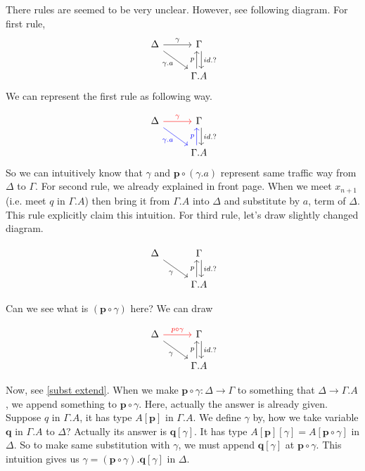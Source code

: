 \documentclass[12pt, a4paper, openany, twoside]{book}
\theoremstyle{definition}
\theoremstyle{remark}
\theoremstyle{plain}
\numberwithin{equation}{section}
\begin{document}
There rules are seemed to be very unclear. However, see following diagram. For first rule, 
\[
\begin{tikzcd}
    \Delta \arrow[r, "\gamma"] \arrow[rd, "\gamma.a"'] & \Gamma \arrow[d, "id.?", shift left]\\
    & \Gamma.A \arrow[u, "p", shift left]
\end{tikzcd}
\]
We can represent the first rule as following way. 

\[
\begin{tikzcd}
    \Delta \arrow[r, "\gamma", red] \arrow[rd, "\gamma.a"', blue] & \Gamma \arrow[d, "id.?", shift left]\\
    & \Gamma.A \arrow[u, "p", shift left, blue]
\end{tikzcd}
\]
So we can intuitively know that $\gamma$ and $\mathbf{p} \circ (\gamma.a)$ represent same traffic way from $\Delta$ to $\Gamma$. 
For second rule, we already explained in front page. When we meet $x_{n+1}$ (i.e. meet $q$ in $\Gamma.A$) 
then bring it from $\Gamma.A$ into $\Delta$ and substitute by $a$, term of $\Delta$. This rule explicitly claim this intuition. 
For third rule, let's draw slightly changed diagram. 

\[
\begin{tikzcd}
    \Delta  \arrow[rd, "\gamma"'] & \Gamma \arrow[d, "id.?", shift left]\\
    & \Gamma.A \arrow[u, "p", shift left]
\end{tikzcd}
\]

Can we see what is $(\mathbf{p} \circ \gamma)$ here? We can draw 

\[
\begin{tikzcd}
    \Delta \arrow[r, "p\circ \gamma", red] \arrow[rd, "\gamma"'] & \Gamma \arrow[d, "id.?", shift left]\\
    & \Gamma.A \arrow[u, "p", shift left]
\end{tikzcd}
\]

Now, see \ref{subst extend}. When we make $\mathbf{p} \circ \gamma : \Delta \rightarrow \Gamma$ to something that $\Delta \rightarrow \Gamma.A$, 
we append something to $\mathbf{p} \circ \gamma$. Here, actually the answer is already given. Suppose 
$q$ in $\Gamma.A$, it has type $A[\mathbf{p}]$ in $\Gamma.A$. We define $\gamma$ by, how we take variable $\mathbf{q}$ in $\Gamma.A$ to $\Delta$? 
Actually its answer is $\mathbf{q}[\gamma]$. It has type $A[\mathbf{p}][\gamma] = A[\mathbf{p} \circ \gamma]$ in $\Delta$. 
So to make same substitution with $\gamma$, we must append $\mathbf{q}[\gamma]$ at $\mathbf{p}\circ \gamma$. This intuition gives us $\gamma = (\mathbf{p}\circ \gamma).\mathbf{q}[\gamma]$ in $\Delta$. 
\end{document}
